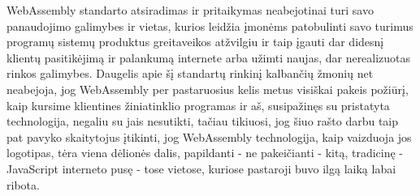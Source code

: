 \documentclass{VUMIFPSkursinis}
\begin{document}
WebAssembly standarto atsiradimas ir pritaikymas neabejotinai turi savo panaudojimo galimybes ir vietas, kurios leidžia įmonėms patobulinti savo turimus programų sistemų produktus greitaveikos atžvilgiu ir taip įgauti dar didesnį klientų pasitikėjimą ir palankumą internete arba užimti naujas, dar nerealizuotas rinkos galimybes. Daugelis apie šį standartų rinkinį kalbančių žmonių net neabejoja, jog WebAssembly per pastaruosius kelis metus visiškai pakeis požiūrį, kaip kursime klientines žiniatinklio programas ir aš, susipažinęs su pristatyta technologija, negaliu su jais nesutikti, tačiau tikiuosi, jog šiuo rašto darbu taip pat pavyko skaitytojus įtikinti, jog WebAssembly technologija, kaip vaizduoja jos logotipas, tėra viena dėlionės dalis, papildanti - ne pakeičianti - kitą, tradicinę - JavaScript interneto pusę - tose vietose, kuriose pastaroji buvo ilgą laiką labai ribota.
\printbibliography[heading=bibintoc, title=Šaltiniai]  %
\end{document}
